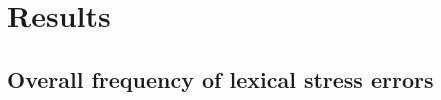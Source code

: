 %				
%				
%				
%				
%					
%					
%					
%					
		
		

	\section{Results}
	\label{sec:lexstress:results}		
	
			
			
			
		\subsection{Overall frequency of lexical stress errors}
		\label{sec:results:overall}
		
		
